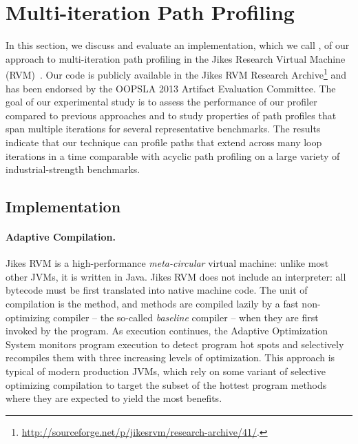 
\section{Multi-iteration Path Profiling}

In this section, we discuss and evaluate an implementation, which we call \kblpp, of our approach to multi-iteration path profiling in the Jikes Research Virtual Machine (RVM)~\cite{Alpern00}. Our code is publicly available in the Jikes RVM Research Archive\footnote{\url{http://sourceforge.net/p/jikesrvm/research-archive/41/}.} and has been endorsed by the OOPSLA 2013 Artifact Evaluation Committee. The goal of our experimental study is to assess the performance of our profiler compared to previous approaches and to study properties of path profiles that span multiple iterations for several representative benchmarks. The results indicate that our technique can profile paths that extend across many loop iterations in a time comparable with acyclic path profiling on a large variety of industrial-strength benchmarks.

\subsection{Implementation}
\label{ss:kblpp-implementation}

\paragraph*{Adaptive Compilation.}  Jikes RVM is a high-performance {\em meta-circular} virtual machine: unlike most other JVMs, it is written in Java. Jikes RVM does not include an interpreter: all bytecode must be first translated into native machine code. The unit of compilation is the method, and methods are compiled lazily by a fast non-optimizing compiler -- the so-called {\em baseline} compiler -- when they are first invoked by the program. As execution continues, the Adaptive Optimization System monitors program execution to detect program hot spots and selectively recompiles them with three increasing levels of optimization. This approach is typical of modern production JVMs, which rely on some variant of selective optimizing compilation to target the subset of the hottest program methods where they are expected to yield the most benefits.

